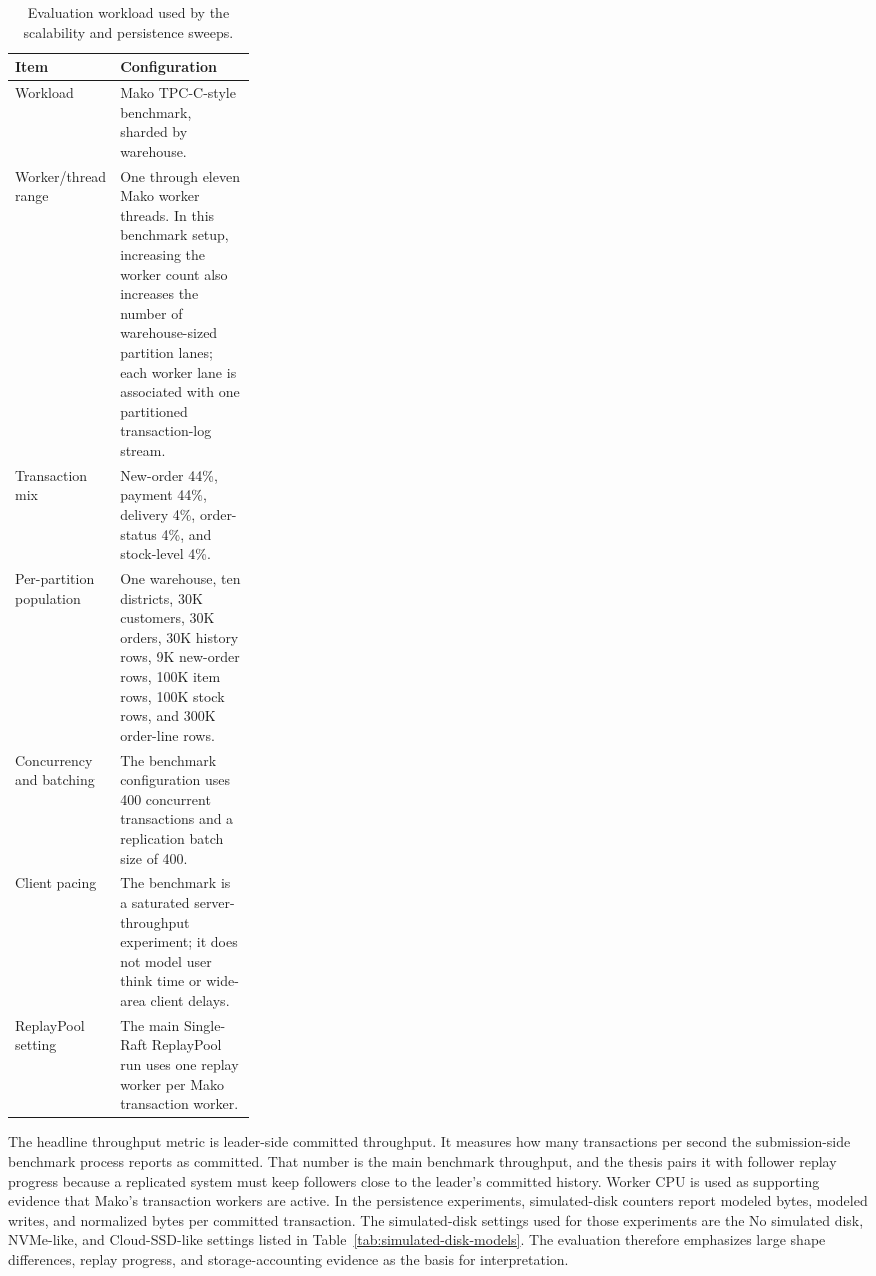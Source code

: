 \begin{table}[htbp]
\centering
\caption[Evaluation workload]{Evaluation workload used by the scalability and persistence sweeps.}
\label{tab:evaluation-workload}
\small
\begin{tabularx}{\linewidth}{@{}>{\raggedright\arraybackslash}p{0.28\linewidth}X@{}}
\toprule
\textbf{Item} & \textbf{Configuration} \\
\midrule
Workload &
Mako TPC-C-style benchmark, sharded by warehouse. \\
\addlinespace
Worker/thread range &
One through eleven Mako worker threads. In this benchmark setup, increasing the worker count also increases the number of warehouse-sized partition lanes; each worker lane is associated with one partitioned transaction-log stream. \\
\addlinespace
Transaction mix &
New-order 44\%, payment 44\%, delivery 4\%, order-status 4\%, and stock-level 4\%. \\
\addlinespace
Per-partition population &
One warehouse, ten districts, 30K customers, 30K orders, 30K history rows, 9K new-order rows, 100K item rows, 100K stock rows, and 300K order-line rows. \\
\addlinespace
Concurrency and batching &
The benchmark configuration uses 400 concurrent transactions and a replication batch size of 400. \\
\addlinespace
Client pacing &
The benchmark is a saturated server-throughput experiment; it does not model user think time or wide-area client delays. \\
\addlinespace
ReplayPool setting &
The main Single-Raft ReplayPool run uses one replay worker per Mako transaction worker. \\
\bottomrule
\end{tabularx}
\end{table}
\FloatBarrier

The headline throughput metric is leader-side committed throughput. It measures
how many transactions per second the submission-side benchmark process reports
as committed. That number is the main benchmark throughput, and the thesis
pairs it with follower replay progress because a replicated system must keep
followers close to the leader's committed history. Worker CPU is
used as supporting evidence that Mako's transaction workers are active. In the
persistence experiments, simulated-disk counters report modeled bytes, modeled
writes, and normalized bytes per committed transaction. The simulated-disk
settings used for those experiments are the No simulated disk, NVMe-like, and
Cloud-SSD-like settings listed in Table~\ref{tab:simulated-disk-models}. The
evaluation therefore emphasizes large shape differences, replay progress, and
storage-accounting evidence as the basis for interpretation.

